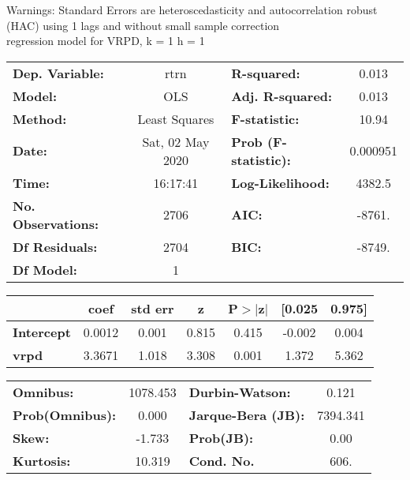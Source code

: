 Warnings: \newline
 [1] Standard Errors are heteroscedasticity and autocorrelation robust (HAC) using 1 lags and without small sample correction\\ 

regression model for VRPD, k = 1 h = 1\begin{center}
\begin{tabular}{lclc}
\toprule
\textbf{Dep. Variable:}    &       rtrn       & \textbf{  R-squared:         } &     0.013   \\
\textbf{Model:}            &       OLS        & \textbf{  Adj. R-squared:    } &     0.013   \\
\textbf{Method:}           &  Least Squares   & \textbf{  F-statistic:       } &     10.94   \\
\textbf{Date:}             & Sat, 02 May 2020 & \textbf{  Prob (F-statistic):} &  0.000951   \\
\textbf{Time:}             &     16:17:41     & \textbf{  Log-Likelihood:    } &    4382.5   \\
\textbf{No. Observations:} &        2706      & \textbf{  AIC:               } &    -8761.   \\
\textbf{Df Residuals:}     &        2704      & \textbf{  BIC:               } &    -8749.   \\
\textbf{Df Model:}         &           1      & \textbf{                     } &             \\
\bottomrule
\end{tabular}
\begin{tabular}{lcccccc}
                   & \textbf{coef} & \textbf{std err} & \textbf{z} & \textbf{P$> |$z$|$} & \textbf{[0.025} & \textbf{0.975]}  \\
\midrule
\textbf{Intercept} &       0.0012  &        0.001     &     0.815  &         0.415        &       -0.002    &        0.004     \\
\textbf{vrpd}      &       3.3671  &        1.018     &     3.308  &         0.001        &        1.372    &        5.362     \\
\bottomrule
\end{tabular}
\begin{tabular}{lclc}
\textbf{Omnibus:}       & 1078.453 & \textbf{  Durbin-Watson:     } &    0.121  \\
\textbf{Prob(Omnibus):} &   0.000  & \textbf{  Jarque-Bera (JB):  } & 7394.341  \\
\textbf{Skew:}          &  -1.733  & \textbf{  Prob(JB):          } &     0.00  \\
\textbf{Kurtosis:}      &  10.319  & \textbf{  Cond. No.          } &     606.  \\
\bottomrule
\end{tabular}
\end{center}

